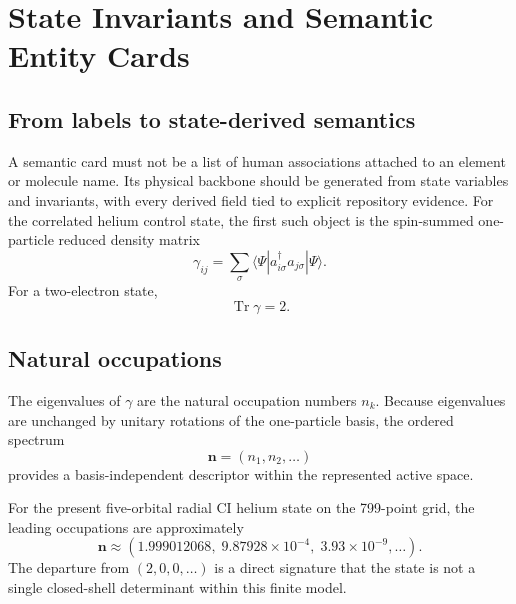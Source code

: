 \chapter{State Invariants and Semantic Entity Cards}

\section{From labels to state-derived semantics}
A semantic card must not be a list of human associations attached to an element or molecule name. Its physical backbone should be generated from state variables and invariants, with every derived field tied to explicit repository evidence. For the correlated helium control state, the first such object is the spin-summed one-particle reduced density matrix
\begin{equation}
\gamma_{ij}=\sum_{\sigma}\langle\Psi|a^\dagger_{i\sigma}a_{j\sigma}|\Psi\rangle.
\end{equation}
For a two-electron state,
\begin{equation}
\operatorname{Tr}\gamma=2.
\end{equation}

\section{Natural occupations}
The eigenvalues of $\gamma$ are the natural occupation numbers $n_k$. Because eigenvalues are unchanged by unitary rotations of the one-particle basis, the ordered spectrum
\begin{equation}
\mathbf n=(n_1,n_2,\ldots)
\end{equation}
provides a basis-independent descriptor within the represented active space.

For the present five-orbital radial CI helium state on the 799-point grid, the leading occupations are approximately
\begin{equation}
\mathbf n\approx(1.999012068,\;9.87928\times10^{-4},\;3.93\times10^{-9},\ldots).
\end{equation}
The departure from $(2,0,0,\ldots)$ is a direct signature that the state is not a single closed-shell determinant within this finite model.

